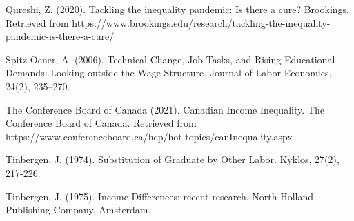 \documentclass[undefended]{bumrp}
\begin{document}
\begin{hangparas}{.25in}{1}
Qureshi, Z. (2020). Tackling the inequality pandemic: Is there a cure? Brookings. Retrieved from https://www.brookings.edu/research/tackling-the-inequality-pandemic-is-there-a-cure/

Spitz‐Oener, A. (2006). Technical Change, Job Tasks, and Rising Educational Demands: Looking outside the Wage Structure. Journal of Labor Economics, 24(2), 235–270.

The Conference Board of Canada (2021). Canadian Income Inequality. The Conference Board of Canada. Retrieved from https://www.conferenceboard.ca/hcp/hot-topics/canInequality.aspx

Tinbergen, J. (1974). Substitution of Graduate by Other Labor. Kyklos, 27(2), 217-226.

Tinbergen, J. (1975). Income Differences: recent research. North-Holland Publishing Company, Amsterdam.

\end{hangparas}
\end{document}
